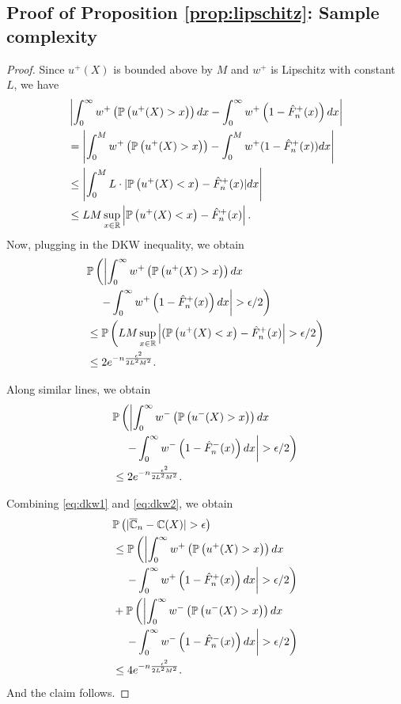\subsection*{Proof of Proposition \ref{prop:lipschitz}: Sample complexity}

\begin{proof}
Since $u^+(X)$ is bounded above by $M$ and $w^+$ is Lipschitz with constant $L$, we have
\begin{align*}
&\left|\int_0^{\infty} w^+\left(\mathbb{P}\left( u^+(X)>x \right)\right) dx- \int_0^{\infty} w^+\left(1- \hat F_n^+(x)\right) dx\right|
\\
&=  \left|\int_0^M w^+\left(\mathbb{P}\left( u^+(X)>x \right)\right) - \int_0^M w^+(1- {\hat F_n}^+(x)) dx\right|
\\
&\leq
\left|\int_0^M L\cdot |\mathbb{P}\left( u^+(X)<x \right)-{\hat F_n}^+(x)| dx\right|\\
&\leq
LM\sup_{x\in \mathbb{R}}\left|\mathbb{P}\left( u^+(X)<x \right)-{\hat F_n}^+(x)\right|.
\end{align*}
Now, plugging in the DKW inequality, we obtain
\begin{align}
&
\mathbb{P}\left(\left|\intinfinity w^+\left(\Prob{u^+(X)>x}\right) dx\right.\right.\nonumber\\
&\quad\left.\left.- \intinfinity w^+\left(1- {\hat F_n}^+(x)\right) dx\right|>\epsilon/2\right)
\nonumber\\
&
\leq
 \Prob{LM\sup_{x\in \mathbb{R}} \left|(\Prob{u^+(X)<x}-{\hat F_n}^+(x)\right|>\epsilon/2} \nonumber\\
&\leq 2 e^{-n \frac{\epsilon^2}{2 L^2 M^2}}.\label{eq:dkw1}
\end{align}

Along similar lines, we obtain
\begin{align}
&
\mathbb{P}\left(\left|\intinfinity w^-\left(\Prob{u^-(X)>x}\right) dx \right.\right.\nonumber\\
&\quad\left.\left.- \intinfinity w^-\left(1- {\hat F_n}^-(x)\right) dx\right|>\epsilon/2\right)\nonumber\\
& \leq 2 e^{-n \frac{\epsilon^2}{2 L^2 M^2}}.\label{eq:dkw2}
\end{align}

Combining \eqref{eq:dkw1} and \eqref{eq:dkw2}, we obtain
\begin{align*}
&\Prob{|\overline \C_n - \C(X)|>\epsilon}\\ 
&\le \mathbb{P}\left(\left|\intinfinity w^+\left(\Prob{u^+(X)>x}\right) dx\right.\right.\\
&\quad\left.\left.- \intinfinity w^+\left(1- {\hat F_n}^+(x)\right) dx\right|>\epsilon/2\right) \\
&+ 
\mathbb{P}\left(\left|\intinfinity w^-\left(\Prob{u^-(X)>x}\right) dx\right.\right.\\
&\left.\left.\quad- \intinfinity w^-\left(1- {\hat F_n}^-(x)\right) dx\right|>\epsilon/2\right)\\
&\le 4 e^{-n \frac{\epsilon^2}{2 L^2 M^2}}.
\end{align*} 
And the claim follows. 
\end{proof}

